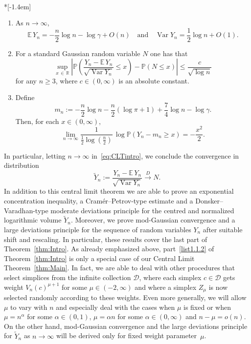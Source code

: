\documentclass[AHL,Unicode,longabstracts,published]{cedram}
\newcommand{\R}{\mathbb{R}}
\newcommand{\EE}{\mathbb{E}\,}
\newcommand{\PP}{\mathbb{P}}
\newcommand{\dscr}{\mathcal{D}}
\newcommand{\Var}{\mathop{\mathrm{Var}}\nolimits}
\newcommand*{\romanenumi}{\renewcommand*{\theenumi}{\roman{enumi}}}
\begin{document}
\begin{theo}\label{thm:Intro}\ \\*[-1.4em]
\begin{enumerate}\romanenumi
\item \label{list1.1.1}As $n\to\infty$,
\[
\EE Y_n = -\frac{n}{2}\log n -\log\gamma +O(n)\quad\text{and}\quad\Var Y_n = \frac{1}{2}\log n+O(1).
\]

\item \label{list1.1.2}For a standard Gaussian random variable $N$ one has that
\begin{equation}\label{eq:CLTintro}
\sup_{x\,\in\,\R}\left|\PP\left(\frac{Y_n-\EE Y_n}{\sqrt{\Var Y_n}}\leq x\right)-\PP(N\leq x)\right| \leq \frac{c}{\sqrt{\log n}}
\end{equation}
for any $n\geq 3$, where $c\in(0,\infty)$ is an absolute constant.
\item \label{list1.1.3}Define
\[
m_n:=-\frac{n}{2}\log n-\frac{n}{2}(\log\pi +1)+\frac{7}{4}\log n -\log\gamma.
\]
Then, for each $x\in(0,\infty)$,
\[
\lim_{n\to\infty}\frac{1}{\frac{1}{2}\log(\frac{n}{2})}\,\log\PP(Y_n-m_n\geq x) = -\frac{x^2}{2}.
\]
\end{enumerate}
\end{theo}

In particular, letting $n\to\infty$ in~\eqref{eq:CLTintro}, we conclude the convergence in distribution
\[
\widetilde{Y}_{n}:=\frac{Y_n-\EE Y_n}{\sqrt{\Var Y_n}} \overset{D}{\longrightarrow} N.
\]
In addition to this central limit theorem we are able to prove an exponential concentration inequality, a Cramér--Petrov-type estimate and a Donsker--Varadhan-type moderate deviations principle for the centred and normalized logarithmic volume $\widetilde{Y}_{n}$. Moreover, we prove mod-Gaussian convergence and a large deviations principle for the sequence of random variables $Y_n$ after suitable shift and rescaling. In particular, these results cover the last part of Theorem~\ref{thm:Intro}. As already emphasized above, part~\eqref{list1.1.2} of Theorem~\ref{thm:Intro} is only a special case of our Central Limit Theorem~\ref{thm:Main}. In fact, we are able to deal with other procedures that select simplices from the infinite collection $\dscr$, where each simplex $c\in\dscr$ gets weight $V_n(c)^{\mu+1}$ for some $\mu\in(-2,\infty)$ and where a simplex $Z_{\mu}$ is now selected randomly according to these weights. Even more generally, we will allow $\mu$ to vary with $n$ and especially deal with the cases when $\mu$ is fixed or when $\mu=n^\alpha$ for some $\alpha\in(0,1)$, $\mu=\alpha n$ for some $\alpha\in(0,\infty)$ and $n-\mu=o(n)$. On the other hand, mod-Gaussian convergence and the large deviations principle for $\widetilde{Y}_n$ as $n\to\infty$ will be derived only for fixed weight parameter~$\mu$.
\end{document}
